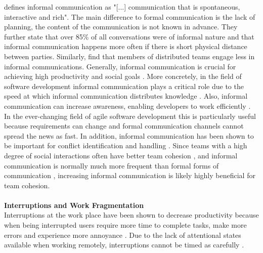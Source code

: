 \cite{kraut1990informal} defines informal communication as "[...] communication that is spontaneous, interactive and rich". The main difference to formal communication is the lack of planning, the content of the communication is not known in advance. They further state that over 85\% of all conversations were of informal nature and that informal communication happens more often if there is short physical distance between parties. Similarly, \cite{hinds2005understanding} find that members of distributed teams engage less in informal communications. Generally, informal communication is crucial for achieving high productivity and social goals \cite{kraut1990informal}. More concretely, in the field of software development informal communication plays a critical role due to the speed at which informal communication distributes knowledge \cite{french1998study, mockus2001challenges}. Also, informal communication can increase awareness, enabling developers to work efficiently \cite{herbsleb2001global}. In the ever-changing field of agile software development this is particularly useful because requirements can change and formal communication channels cannot spread the news as fast. In addition, informal communication has been shown to be important for conflict identification and handling \cite{hinds2005understanding}. Since teams with a high degree of social interactions often have better team cohesion \cite{staehle2014management}, and informal communication is normally much more frequent than formal forms of communication \cite{kraut1990informal}, increasing informal communication is likely highly beneficial for team cohesion.
\\\\
\textbf{Interruptions and Work Fragmentation}\\
Interruptions at the work place have been shown to decrease productivity because when being interrupted users require more time to complete tasks, make more errors and experience more annoyance \cite{bailey2006need}. Due to the lack of attentional states available when working remotely, interruptions cannot be timed as carefully \cite{mark2005no}.


